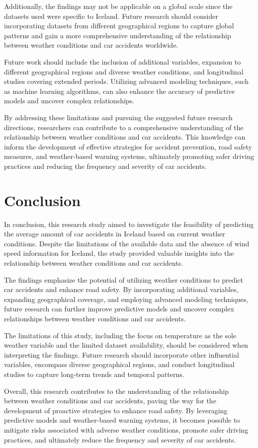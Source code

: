\documentclass{article}
\begin{document}
Additionally, the findings may not be applicable on a global scale since the datasets used were specific to Iceland. Future research should consider incorporating datasets from different geographical regions to capture global patterns and gain a more comprehensive understanding of the relationship between weather conditions and car accidents worldwide.

Future work should include the inclusion of additional variables, expansion to different geographical regions and diverse weather conditions, and longitudinal studies covering extended periods. Utilizing advanced modeling techniques, such as machine learning algorithms, can also enhance the accuracy of predictive models and uncover complex relationships.

By addressing these limitations and pursuing the suggested future research directions, researchers can contribute to a comprehensive understanding of the relationship between weather conditions and car accidents. This knowledge can inform the development of effective strategies for accident prevention, road safety measures, and weather-based warning systems, ultimately promoting safer driving practices and reducing the frequency and severity of car accidents.


\section{Conclusion}

In conclusion, this research study aimed to investigate the feasibility of predicting the average amount of car accidents in Iceland based on current weather conditions. Despite the limitations of the available data and the absence of wind speed information for Iceland, the study provided valuable insights into the relationship between weather conditions and car accidents.

The findings emphasize the potential of utilizing weather conditions to predict car accidents and enhance road safety. By incorporating additional variables, expanding geographical coverage, and employing advanced modeling techniques, future research can further improve predictive models and uncover complex relationships between weather conditions and car accidents.

The limitations of this study, including the focus on temperature as the sole weather variable and the limited dataset availability, should be considered when interpreting the findings. Future research should incorporate other influential variables, encompass diverse geographical regions, and conduct longitudinal studies to capture long-term trends and temporal patterns.

Overall, this research contributes to the understanding of the relationship between weather conditions and car accidents, paving the way for the development of proactive strategies to enhance road safety. By leveraging predictive models and weather-based warning systems, it becomes possible to mitigate risks associated with adverse weather conditions, promote safer driving practices, and ultimately reduce the frequency and severity of car accidents.



\end{document}
